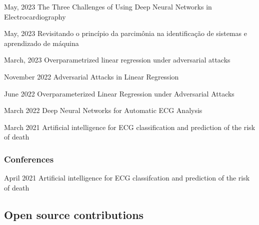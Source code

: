 \documentclass[10pt,letterpaper]{article} %
\begin{document}
    
    { May, 2023 }
    { The Three Challenges of Using Deep Neural Networks in Electrocardiography  }
    { }{}
    

    
    { May, 2023 }
    { Revisitando o princípio da parcimônia na identificação de sistemas e aprendizado de máquina  }
    { }{}
    

    
    { March, 2023 }
    { Overparametrized linear regression under adversarial attacks  }
    { }{}
    

    
    { November 2022 }
    { Adversarial Attacks in Linear Regression  }
    { }{}
    

    
    { June 2022 }
    { Overparameterized Linear Regression under Adversarial Attacks  }
    { }{}
    

    
    { March 2022 }
    { Deep Neural Networks for Automatic ECG Analysis  }
    { }{}
    

    
    { March 2021 }
    { Artificial intelligence for ECG classification and prediction of the risk of death  }
    { }{}
    


\subsubsection*{Conferences}


    
    { April 2021 }
    { Artificial intelligence for ECG classifcation and prediction of the risk of death  }
    { }{}
    



\subsection*{Open source contributions}
\end{document}
